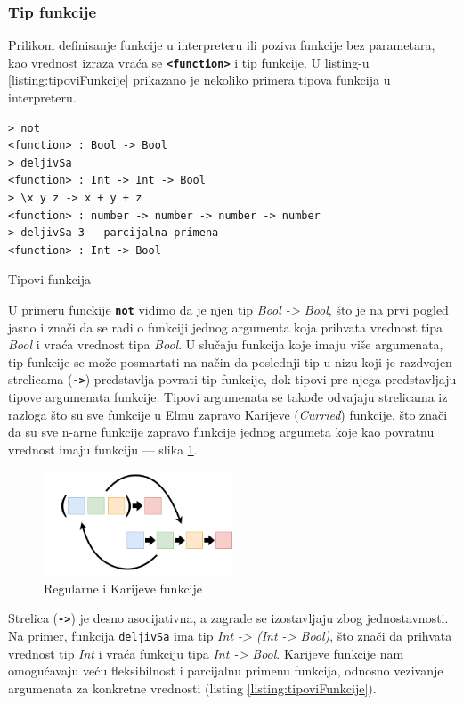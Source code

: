 \documentclass[12pt,oneside]{memoir}
\begin{document}
\subsubsection{Tip funkcije}
Prilikom definisanje funkcije u interpreteru ili
poziva funkcije bez parametara, kao vrednost izraza vraća se \texttt{\textbf{<function>}} 
i tip funkcije. U listing-u  \ref{listing:tipoviFunkcije} prikazano je nekoliko primera 
tipova funkcija u interpreteru.
\begin{listing}[h]
\begin{verbatim}
> not
<function> : Bool -> Bool
> deljivSa
<function> : Int -> Int -> Bool
> \x y z -> x + y + z
<function> : number -> number -> number -> number
> deljivSa 3 --parcijalna primena
<function> : Int -> Bool
\end{verbatim}
\caption{Tipovi funkcija}
\label{listing:tipoviFunkcije}
\end{listing} 
  
U primeru funckije \texttt{\textbf{not}} vidimo da je njen tip \emph{Bool -> Bool},
što je na prvi pogled jasno i znači da se radi o funkciji jednog argumenta koja
prihvata vrednost tipa \emph{Bool} i vraća vrednost tipa \emph{Bool}. U slučaju
funkcija koje imaju više argumenata, tip funkcije se može
posmartati na način da poslednji tip u nizu koji je razdvojen strelicama
(\texttt{\textbf{->}}) predstavlja povrati tip funkcije, dok tipovi pre njega 
predstavljaju tipove argumenata funkcije. Tipovi argumenata se takođe odvajaju strelicama
iz razloga što su sve funkcije u Elmu zapravo Karijeve (\emph{Curried}) funkcije,
što znači da su sve n-arne funkcije zapravo funkcije jednog argumeta
koje kao povratnu vrednost imaju funkciju --- slika \ref{fig:currying}.
\begin{figure}[!h]
  \centering
  \includegraphics[width=0.5\textwidth]{currying.png}
  \caption{Regularne i Karijeve funkcije}
  \label{fig:currying}
\end{figure}
Strelica (\texttt{\textbf{->}}) je desno asocijativna, a zagrade se izostavljaju zbog
jednostavnosti. Na primer, funkcija \texttt{deljivSa} ima tip \emph{Int -> (Int -> Bool)},
što znači da prihvata vrednost tip \emph{Int} i vraća funkciju tipa \emph{Int -> Bool}.
Karijeve funkcije nam omogućavaju veću fleksibilnost i parcijalnu primenu funkcija, 
odnosno vezivanje argumenata za konkretne vrednosti (listing \ref{listing:tipoviFunkcije}).
\end{document}
